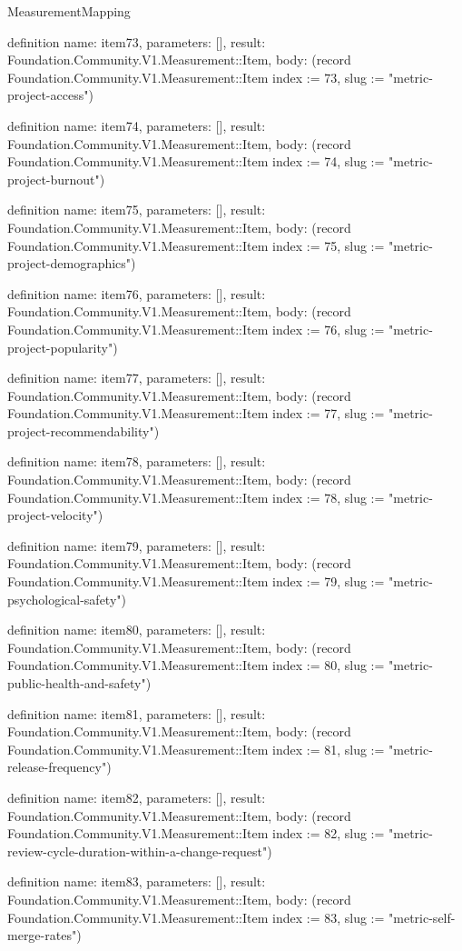 \begin{lexlean}{MeasurementMapping}
\begin{semanticmodule}
definition{
  name: item73,
  parameters: [],
  result: Foundation.Community.V1.Measurement::Item,
  body: (record Foundation.Community.V1.Measurement::Item {index := 73, slug := "metric-project-access"})
}

definition{
  name: item74,
  parameters: [],
  result: Foundation.Community.V1.Measurement::Item,
  body: (record Foundation.Community.V1.Measurement::Item {index := 74, slug := "metric-project-burnout"})
}

definition{
  name: item75,
  parameters: [],
  result: Foundation.Community.V1.Measurement::Item,
  body: (record Foundation.Community.V1.Measurement::Item {index := 75, slug := "metric-project-demographics"})
}

definition{
  name: item76,
  parameters: [],
  result: Foundation.Community.V1.Measurement::Item,
  body: (record Foundation.Community.V1.Measurement::Item {index := 76, slug := "metric-project-popularity"})
}

definition{
  name: item77,
  parameters: [],
  result: Foundation.Community.V1.Measurement::Item,
  body: (record Foundation.Community.V1.Measurement::Item {index := 77, slug := "metric-project-recommendability"})
}

definition{
  name: item78,
  parameters: [],
  result: Foundation.Community.V1.Measurement::Item,
  body: (record Foundation.Community.V1.Measurement::Item {index := 78, slug := "metric-project-velocity"})
}

definition{
  name: item79,
  parameters: [],
  result: Foundation.Community.V1.Measurement::Item,
  body: (record Foundation.Community.V1.Measurement::Item {index := 79, slug := "metric-psychological-safety"})
}

definition{
  name: item80,
  parameters: [],
  result: Foundation.Community.V1.Measurement::Item,
  body: (record Foundation.Community.V1.Measurement::Item {index := 80, slug := "metric-public-health-and-safety"})
}

definition{
  name: item81,
  parameters: [],
  result: Foundation.Community.V1.Measurement::Item,
  body: (record Foundation.Community.V1.Measurement::Item {index := 81, slug := "metric-release-frequency"})
}

definition{
  name: item82,
  parameters: [],
  result: Foundation.Community.V1.Measurement::Item,
  body: (record Foundation.Community.V1.Measurement::Item {index := 82, slug := "metric-review-cycle-duration-within-a-change-request"})
}

definition{
  name: item83,
  parameters: [],
  result: Foundation.Community.V1.Measurement::Item,
  body: (record Foundation.Community.V1.Measurement::Item {index := 83, slug := "metric-self-merge-rates"})
}


\end{semanticmodule}
\end{lexlean}
